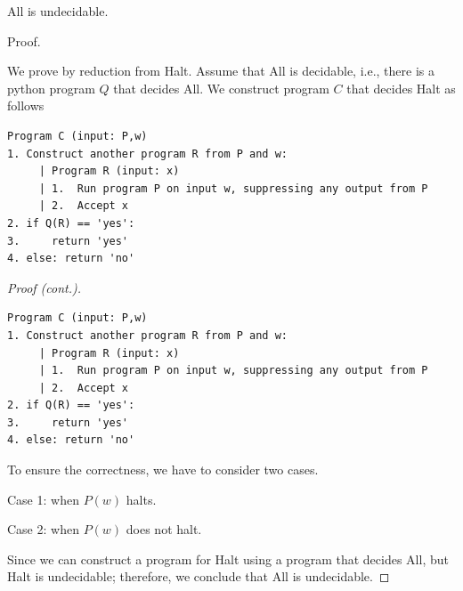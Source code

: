 \begin{frame}[fragile=true]
  \begin{lemma}
    {\sc All} is undecidable.
  \end{lemma}
  \begin{block}{Proof.}
    {\small
      
    We prove by reduction from {\sc Halt}.  Assume that {\sc All} is
    decidable, i.e., there is a python program $Q$ that decides {\sc
      All}.  We construct program $C$ that decides {\sc Halt} as
    follows

    {\footnotesize
\begin{verbatim}
Program C (input: P,w)
1. Construct another program R from P and w:
     | Program R (input: x)
     | 1.  Run program P on input w, suppressing any output from P
     | 2.  Accept x
2. if Q(R) == 'yes':
3.     return 'yes'
4. else: return 'no'
\end{verbatim}
    }
    }
  \end{block}
\end{frame}

\begin{frame}[fragile=true]
  \begin{proof}[Proof (cont.)]
    {\footnotesize
\begin{verbatim}
Program C (input: P,w)
1. Construct another program R from P and w:
     | Program R (input: x)
     | 1.  Run program P on input w, suppressing any output from P
     | 2.  Accept x
2. if Q(R) == 'yes':
3.     return 'yes'
4. else: return 'no'
\end{verbatim}
    }
    {\small
      To ensure the correctness, we have to consider two cases.

      Case 1: when $P(w)$ halts. \pause
      
      Case 2: when $P(w)$ does not halt. \pause

      Since we can construct a program for {\sc Halt} using a program
      that decides {\sc All}, but {\sc Halt} is undecidable;
      therefore, we conclude that {\sc All} is undecidable.
    }
  \end{proof}
\end{frame}



